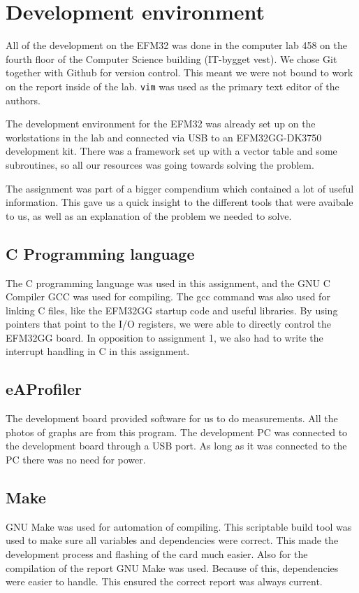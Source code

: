 \section{Development environment}
All of the development on the EFM32 was done in the computer lab 458 on the fourth floor of the Computer Science building (IT-bygget vest). We chose Git together with Github for version control. This meant we were not bound to work on the report inside of the lab. \texttt{vim} was used as the primary text editor of the authors.

The development environment for the EFM32 was already set up on the workstations in the lab and connected via USB to an EFM32GG-DK3750 development kit. There was a framework set up with a vector table and some subroutines, so all our resources was going towards solving the problem.

The assignment was part of a bigger compendium \cite{eeds-compendium} which contained a lot of useful information. This gave us a quick insight to the different tools that were avaibale to us, as well as an explanation of the problem we needed to solve.

\subsection{C Programming language}
The C programming language was used in this assignment, and the GNU C Compiler GCC was used for compiling.
The gcc command was also used for linking C files, like the EFM32GG startup code and useful libraries. By using pointers that point to the I/O registers, we were able to directly control the EFM32GG board. In opposition to assignment 1, we also had to write the interrupt handling in C in this assignment.

\subsection{eAProfiler}
The development board provided software for us to do measurements. All the photos of graphs are from this program. The development PC was connected to the development board through a USB port. As long as it was connected to the PC there was no need for power.

\subsection{Make}
GNU Make was used for automation of compiling. This scriptable build tool was used to make sure all variables and dependencies were correct. This made the development process and flashing of the card much easier. Also for the compilation of the report GNU Make was used. Because of this, dependencies were easier to handle. This ensured the correct report was always current.

